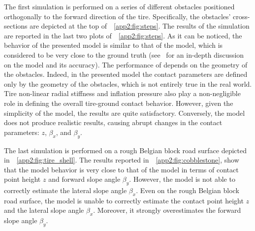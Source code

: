 The first simulation is performed on a series of different obstacles positioned orthogonally to the forward direction of the tire. Specifically, the obstacles' cross-sections are depicted at the top of~\figurename{}~\ref{app2:fig:steps}. The results of the simulation are reported in the last two plots of~\figurename{}~\ref{app2:fig:steps}. As it can be noticed, the behavior of the presented model is similar to that of the \Swift{} model, which is considered to be very close to the ground truth (see~\cite{schmeitz2004semiempirical} for an in-depth discussion on the \Swift{} model and its accuracy). The performance of \Enve{} depends on the geometry of the obstacles. Indeed, in the presented model the contact parameters are defined only by the geometry of the obstacles, which is not entirely true in the real world. Tire non-linear radial stiffness and inflation pressure also play a non-negligible role in defining the overall tire-ground contact behavior. However, given the simplicity of the model, the results are quite satisfactory. Conversely, the \TMEasy{} model does not produce realistic results, causing abrupt changes in the contact parameters: $z$, $\beta_x$, and $\beta_y$.


The last simulation is performed on a rough Belgian block road surface depicted in~\figurename{}~\ref{app2:fig:tire_shell}. The results reported in~\figurename{}~\ref{app2:fig:cobblestone}, show that the \Enve{} model behavior is very close to that of the \Swift{} model in terms of contact point height $z$ and forward slope angle $\beta_y$. However, the \Enve{} model is not able to correctly estimate the lateral slope angle $\beta_x$. Even on the rough Belgian block road surface, the \TMEasy{} model is unable to correctly estimate the contact point height $z$ and the lateral slope angle $\beta_x$. Moreover, it strongly overestimates the forward slope angle $\beta_y$.

